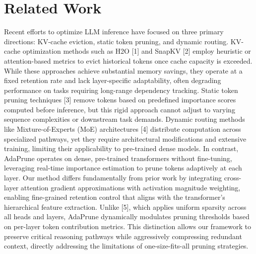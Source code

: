 \documentclass[11pt,a4paper]{article}
\begin{document}
\section{Related Work}
Recent efforts to optimize LLM inference have focused on three primary directions: KV-cache eviction, static token pruning, and dynamic routing. KV-cache optimization methods such as H2O [1] and SnapKV [2] employ heuristic or attention-based metrics to evict historical tokens once cache capacity is exceeded. While these approaches achieve substantial memory savings, they operate at a fixed retention rate and lack layer-specific adaptability, often degrading performance on tasks requiring long-range dependency tracking. Static token pruning techniques [3] remove tokens based on predefined importance scores computed before inference, but this rigid approach cannot adjust to varying sequence complexities or downstream task demands. Dynamic routing methods like Mixture-of-Experts (MoE) architectures [4] distribute computation across specialized pathways, yet they require architectural modifications and extensive training, limiting their applicability to pre-trained dense models. In contrast, AdaPrune operates on dense, pre-trained transformers without fine-tuning, leveraging real-time importance estimation to prune tokens adaptively at each layer. Our method differs fundamentally from prior work by integrating cross-layer attention gradient approximations with activation magnitude weighting, enabling fine-grained retention control that aligns with the transformer's hierarchical feature extraction. Unlike [5], which applies uniform sparsity across all heads and layers, AdaPrune dynamically modulates pruning thresholds based on per-layer token contribution metrics. This distinction allows our framework to preserve critical reasoning pathways while aggressively compressing redundant context, directly addressing the limitations of one-size-fits-all pruning strategies.
\end{document}
